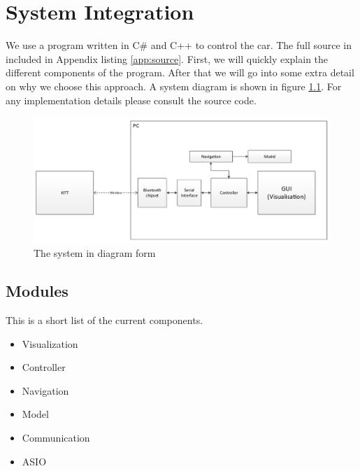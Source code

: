 \documentclass[final]{scrreprt} %
\begin{document}
\chapter{System Integration}
\label{ch:system-integration}
We use a program written in C\# and C++ to control the car.
The full source in included in Appendix listing \ref{app:source}.
First, we will quickly explain the different components of the program.
After that we will go into some extra detail on why we choose this approach.
A system diagram is shown in figure \ref{fig:system-diagram}.
For any implementation details please consult the source code.
\begin{figure}[H]
	\centering    	
    	\includegraphics[width=\textwidth]{resources/system-diagram.pdf}
    	\caption{The system in diagram form}
    	\label{fig:system-diagram}
\end{figure}
\section{Modules}
This is a short list of the current components.
\begin{itemize}
\item Visualization
\item Controller
\item Navigation
\item Model
\item Communication
\item ASIO
\end{itemize}
\end{document}
